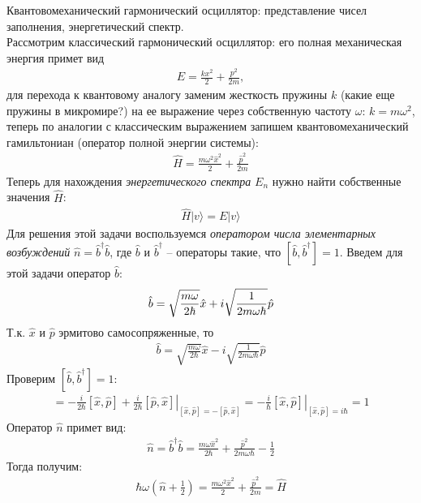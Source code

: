 \documentclass[__main__.tex]{subfiles}
\begin{document}
Квантовомеханический гармонический осциллятор: представление чисел заполнения, энергетический спектр.\\ 


	
	Рассмотрим классический гармонический осциллятор: его полная механическая энергия примет вид
	\begin{gather*}
	E = \frac{kx^2}{2}+\frac{p^2}{2m},
	\end{gather*}
	для перехода к квантовому аналогу заменим жесткость пружины $k$ (какие еще пружины в микромире?) на ее выражение через собственную частоту $\omega$: $k=m\omega^2$, теперь по аналогии с классическим выражением запишем квантовомеханический гамильтониан (оператор полной энергии системы):
	\begin{gather*}
	\hat{H} = \frac{m\omega^2\hat{x}^2}{2}+\frac{\hat{p}^2}{2m}
	\end{gather*}
	Теперь для нахождения \textit{энергетического спектра} $E_n$ нужно найти собственные значения $\hat{H}$:
	\begin{gather*}
	\hat{H}|v\rangle = E|v\rangle
	\end{gather*}
	Для решения этой задачи воспользуемся \textit{оператором числа элементарных возбуждений} $\hat{n}=\hat{b}^\dagger\hat{b}$, где $\hat{b}$ и $\hat{b}^\dagger$ -- операторы такие, что $[\hat{b},\hat{b}^\dagger]=1$. Введем для этой задачи оператор $\hat{b}$: 
	\begin{gather}
	\hat{b} = \sqrt{\frac{m\omega}{2\hbar}}\hat{x} + i\sqrt{\frac{1}{2m\omega\hbar}}\hat{p}
	\llabel{_10:b}
	\end{gather}
	Т.к. $\hat{x}$ и $\hat{p}$ эрмитово самосопряженные, то
	\begin{gather*}
	\hat{b} = \sqrt{\frac{m\omega}{2\hbar}}\hat{x} - i\sqrt{\frac{1}{2m\omega\hbar}}\hat{p}
	\end{gather*}
	Проверим $[\hat{b},\hat{b}^\dagger]=1$:
	\begin{gather*}
	[\hat{b},\hat{b}^\dagger]
	=
	\left.
	-\frac{i}{2\hbar}[\hat{x},\hat{p}]+\frac{i}{2\hbar}[\hat{p},\hat{x}]
	\right|_{[\hat{x},\hat{p}]=-[\hat{p},\hat{x}]}
	=
	\left.
	-\frac{i}{\hbar}[\hat{x},\hat{p}]
	\right|_{[\hat{x},\hat{p}]=i\hbar}
	=
	1
	\end{gather*}
	Оператор $\hat{n}$ примет вид:
	\begin{gather*}
	\hat{n}=\hat{b}^\dagger\hat{b}=\frac{m\omega\hat{x}^2}{2\hbar}+\frac{\hat{p}^2}{2m\omega\hbar}-\frac{1}{2}
	\end{gather*}
	Тогда получим:
	\begin{gather*}
	\hbar\omega\left(\hat{n}+\frac{1}{2}\right)
	=
	\frac{m\omega^2\hat{x}^2}{2}+\frac{\hat{p}^2}{2m}
	=
	\hat{H}
	\end{gather*}
\end{document}
